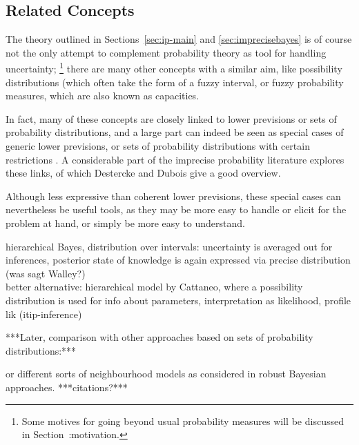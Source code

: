 \subsection{Related Concepts}

The theory outlined in Sections~\ref{sec:ip-main} and \ref{sec:imprecisebayes}
is of course not the only attempt to complement probability theory as tool for handling uncertainty;%
\footnote{Some motives for going beyond usual probability measures will be discussed in Section~:motivation.}
there are many other concepts with a similar aim,
like possibility distributions (which often take the form of a fuzzy interval,
or fuzzy probability measures, which are also known as capacities.

In fact, many of these concepts are closely linked to
lower previsions or sets of probability distributions,
and a large part can indeed be seen as special cases of generic lower previsions, 
or sets of probability distributions with certain restrictions
\parencite[Fig.~5.5]{itip-special}.%
A considerable part of the imprecise probability literature
explores these links, of which Destercke and Dubois \parencite*{itip-other,itip-special}
give a good overview.


Although less expressive than coherent lower previsions,
these special cases can nevertheless be useful tools,
as they may be more easy to handle or elicit for the problem at hand,
or simply be more easy to understand.


hierarchical Bayes, distribution over intervals:
uncertainty is averaged out for inferences,
posterior state of knowledge is again expressed via precise distribution (was sagt Walley?)\\
better alternative: hierarchical model by Cattaneo,
where a possibility distribution is used for info about parameters,
interpretation as likelihood, profile lik (itip-inference)





***Later, comparison with other approaches based on sets of probability distributions:***

or different sorts of neighbourhood models as considered in robust Bayesian approaches. ***citations?*** %


